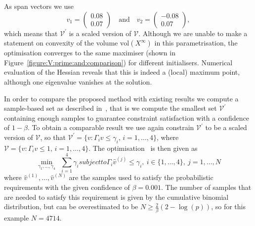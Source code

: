 \documentclass{ifacconf}
\providecommand{\vol}{\text{vol}}
\providecommand{\V}{\mathcal V}
\providecommand{\bfa}[1]{\mathbf{#1}}
\begin{document}
%
As span vectors we use 
\[
v_1 = \begin{pmatrix} 0.08 \\ 0.07\end{pmatrix} \quad \text{and}\quad 
v_2 = \begin{pmatrix}-0.08 \\ 0.07\end{pmatrix},
\] 
which means that $\V^\prime$ is a scaled version of $\V$.
%
Although we are unable to make a statement on convexity of the volume $\vol(X^\infty)$ in this parametrisation, the optimisation converges to the same maximiser (shown in Figure~\ref {figure:V:prime:and:comparison}) for different initialisers. Numerical evaluation of the Hessian reveals that this is indeed a (local) maximum point, although one eigenvalue vanishes at the solution.
%

In order to compare the proposed method with existing results we compute a sample-based set as described in~\cite{Zhang2015}, that is we compute the smallest set $\V^\prime$ containing enough samples to guarantee constraint satisfaction with a confidence of $1-\beta$.
%
To obtain a comparable result we use again constrain $\V^\prime $ to be a scaled version of $\V$, so that $\V^\prime = \{v : \Gamma_i v \leq \gamma_i, \, i =1,\ldots,4\}$, where $\V = \{v : \Gamma_i v \leq 1, \, i =1, \ldots ,4\}$.
%
The optimisation~\citep[eq.~(10)]{Zhang2015} is then given as
%
\begin{subequations}\label{eq:comparison:set}
\begin{equation}\min_{\gamma_1,\dots,\gamma_4} \  \ \sum_{i=1}^4\gamma_i
\end{equation}
subject to 
\begin{equation}
\Gamma_i \hat{v}^{(j)}\leq \gamma_i ,\ i\in\{1,\ldots,4\}, \ j = 1,\ldots,N
\end{equation}
\end{subequations}
%
where $\hat{v}^{(1)},\ldots,\hat{v}^{(N)}$
are the samples used to satisfy the probabilistic requirements with the  given confidence of $\beta=0.001$. The number of samples that are needed to satisfy this requirement is given by the cumulative binomial distribution, but can be overestimated to be $N \geq \frac{2}{\beta}(2-\log(p))$, so for this example $N = 4714$.
%
\end{document}
